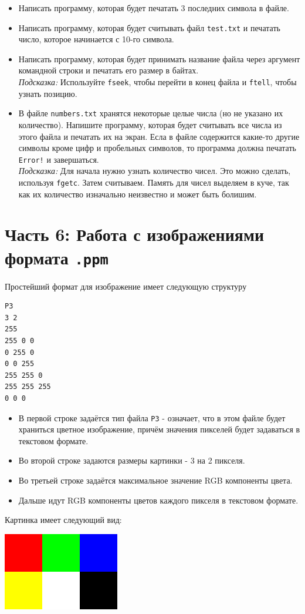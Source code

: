 \documentclass{article}
\begin{document}
\begin{itemize}
\item Написать программу, которая будет печатать 3 последних символа в файле.\\
\item Написать программу, которая будет считывать файл \texttt{test.txt} и печатать число, которое начинается с 10-го символа.
\item Написать программу, которая будет принимать название файла через аргумент командной строки и печатать его размер в байтах.\\
\textit{Подсказка:} Используйте \texttt{fseek}, чтобы перейти в конец файла и \texttt{ftell}, чтобы узнать позицию.

\item В файле \texttt{numbers.txt} хранятся некоторые целые числа (но не указано их количество). Напишите программу, которая будет считывать все числа из этого файла и печатать их на экран. Есла в файле содержится какие-то другие символы кроме цифр и пробельных символов, то программа должна печатать \texttt{Error!} и завершаться.\\
\textit{Подсказка:} Для начала нужно узнать количество чисел. Это можно сделать, используя \texttt{fgetc}. Затем считываем. Память для чисел выделяем в куче, так как их количество изначально неизвестно и может быть болишим.
\end{itemize}






\newpage
\section*{Часть 6: Работа с изображениями формата \texttt{.ppm}}
Простейший формат для изображение имеет следующую структуру
\begin{verbatim}
P3
3 2
255
255 0 0 
0 255 0  
0 0 255 
255 255 0 
255 255 255 
0 0 0
\end{verbatim}
\begin{itemize}
\item В первой строке задаётся тип файла \texttt{P3} - означает, что в этом файле будет храниться цветное изображение, причём значения пикселей будет задаваться в текстовом формате.
\item Во второй строке задаются размеры картинки - 3 на 2 пикселя.
\item Во третьей строке задаётся максимальное значение RGB компоненты цвета.
\item Дальше идут RGB компоненты цветов каждого пикселя в текстовом формате.
\end{itemize}
Картинка имеет следующий вид:
\begin{center}
\includegraphics[scale=0.5]{../images/tiny.png}
\end{center}
\end{document}
